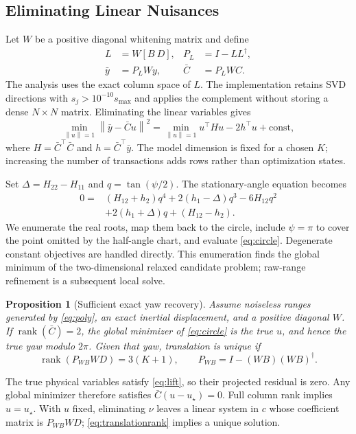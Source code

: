 \documentclass[conference,letterpaper,10pt]{IEEEtran}
\newtheorem{proposition}{Proposition}
\newcommand{\norm}[1]{\left\lVert#1\right\rVert}
\begin{document}
\subsection{Eliminating Linear Nuisances}
Let $W$ be a positive diagonal whitening matrix and define
\begin{equation}
 \begin{aligned}
 L&=W[B\ D],& P_L&=I-LL^{\dagger},\\
 \bar y&=P_LWy,& \bar C&=P_LWC.
 \end{aligned}
 \label{eq:projection}
\end{equation}
The analysis uses the exact column space of $L$. The implementation retains SVD directions with $s_j>10^{-10}s_{\max}$ and applies the complement without storing a dense $N\times N$ matrix. Eliminating the linear variables gives
\begin{equation}
 \min_{\norm{u}=1}\norm{\bar y-\bar C u}^2
 =\min_{\norm{u}=1}u^\top H u-2h^\top u+\mathrm{const},
 \label{eq:circle}
\end{equation}
where $H=\bar C^\top\bar C$ and $h=\bar C^\top\bar y$. The model dimension is fixed for a chosen $K$; increasing the number of transactions adds rows rather than optimization states.

Set $\Delta=H_{22}-H_{11}$ and $q=\tan(\psi/2)$. The stationary-angle equation becomes
\begin{align}
 0={}&(H_{12}+h_2)q^4+2(h_1-\Delta)q^3-6H_{12}q^2\nonumber\\
    &+2(h_1+\Delta)q+(H_{12}-h_2).
 \label{eq:quartic}
\end{align}
We enumerate the real roots, map them back to the circle, include $\psi=\pi$ to cover the point omitted by the half-angle chart, and evaluate \eqref{eq:circle}. Degenerate constant objectives are handled directly. This enumeration finds the global minimum of the two-dimensional relaxed candidate problem; raw-range refinement is a subsequent local solve.

\begin{proposition}[Sufficient exact yaw recovery]
Assume noiseless ranges generated by \eqref{eq:poly}, an exact inertial displacement, and a positive diagonal $W$. If $\operatorname{rank}(\bar C)=2$, the global minimizer of \eqref{eq:circle} is the true $u$, and hence the true yaw modulo $2\pi$. Given that yaw, translation is unique if
\begin{equation}
 \operatorname{rank}\!\left(P_{WB}WD\right)=3(K+1),\qquad
 P_{WB}=I-(WB)(WB)^{\dagger}.
 \label{eq:translationrank}
\end{equation}
\end{proposition}
\begin{IEEEproof}
The true physical variables satisfy \eqref{eq:lift}, so their projected residual is zero. Any global minimizer therefore satisfies $\bar C(u-u_\star)=0$. Full column rank implies $u=u_\star$. With $u$ fixed, eliminating $\nu$ leaves a linear system in $c$ whose coefficient matrix is $P_{WB}WD$; \eqref{eq:translationrank} implies a unique solution.
\end{IEEEproof}
\end{document}
